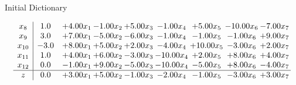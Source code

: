 \documentclass[8pt]{article}
\begin{document}
Initial Dictionary 

\[\begin{array}{c| c c@{\hskip 2pt} c@{\hskip 2pt} c@{\hskip 2pt} c@{\hskip 2pt} c@{\hskip 2pt} c@{\hskip 2pt} c@{\hskip 2pt} }
 x_{8}   &  1.0 & +  4.00 x_{1} & -1.00 x_{2} & +  5.00 x_{3} & -1.00 x_{4} & +  5.00 x_{5} & -10.00 x_{6} & -7.00 x_{7}\\
 x_{9}   &  3.0 & +  7.00 x_{1} & -5.00 x_{2} & -6.00 x_{3} & -1.00 x_{4} & -1.00 x_{5} & -1.00 x_{6} & +  9.00 x_{7}\\
 x_{10}   &  -3.0 & +  8.00 x_{1} & +  5.00 x_{2} & +  2.00 x_{3} & -4.00 x_{4} & + 10.00 x_{5} & -3.00 x_{6} & +  2.00 x_{7}\\
 x_{11}   &  1.0 & +  4.00 x_{1} & +  6.00 x_{2} & -3.00 x_{3} & -10.00 x_{4} & +  2.00 x_{5} & +  8.00 x_{6} & +  4.00 x_{7}\\
 x_{12}   &  0.0 & -1.00 x_{1} & +  9.00 x_{2} & -5.00 x_{3} & -10.00 x_{4} & -5.00 x_{5} & +  8.00 x_{6} & -4.00 x_{7}\\
\hline
z    &  0.0 & +  3.00 x_{1} & +  5.00 x_{2} & -1.00 x_{3} & -2.00 x_{4} & -1.00 x_{5} & -3.00 x_{6} & +  3.00 x_{7}\\
\end{array}\]
\end{document}

